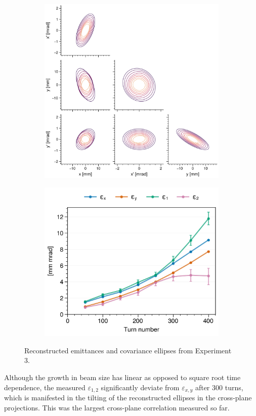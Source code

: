 \begin{figure}[!p]
    \centering
    \begin{subfigure}{0.6\textwidth}
        \includegraphics[width=\textwidth]{Images/chapter5/exp3/corner.png}
    \end{subfigure}
    \hfill
    \begin{subfigure}[t]{0.39\textwidth}
        \includegraphics[width=\textwidth]{Images/chapter5/exp3/emittances.png}
    \end{subfigure}
    \caption{Reconstructed emittances and covariance ellipses from Experiment 3.}
    \label{fig:exp3_emittances}
\end{figure}
% 
Although the growth in beam size has linear as opposed to square root time dependence, the measured $\varepsilon_{1,2}$ significantly deviate from $\varepsilon_{x,y}$ after 300 turns, which is manifested in the tilting of the reconstructed ellipses in the cross-plane projections. This was the largest cross-plane correlation measured so far. 

